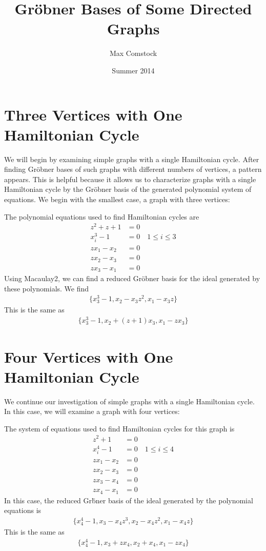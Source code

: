 \documentclass[letterpaper]{article}
\newcommand{\aln}[1]{\begin{align*} #1 \end{align*}} %
\begin{document}
\title{Gr\"obner Bases of Some Directed Graphs}
\author{Max Comstock}
\date{Summer 2014}
\maketitle

\section{Three Vertices with One Hamiltonian Cycle}
We will begin by examining simple graphs with a single Hamiltonian cycle. After finding Gr\"obner bases of such graphs with different numbers of vertices, a pattern appears. This is helpful because it allows us to characterize graphs with a single Hamiltonian cycle by the Gr\"obner basis of the generated polynomial system of equations. We begin with the smallest case, a graph with three vertices:
\begin{center}
\end{center}
The polynomial equations used to find Hamiltonian cycles are
\aln{
  z^2 + z + 1 &= 0\\
  x_i^3 - 1 &= 0 \quad 1 \leq i \leq 3\\
  z x_1 - x_2 &= 0\\
  z x_2 - x_3 &= 0\\
  z x_3 - x_1 &= 0
}
Using Macaulay2, we can find a reduced Gr\"obner basis for the ideal generated by these polynomials. We find
\aln{
  \{x_3^3-1, x_2-x_3z^2, x_1-x_3z\}
}
This is the same as
\aln{
  \{x_3^3-1, x_2+(z+1)x_3, x_1-zx_3\}
}

\newpage

\section{Four Vertices with One Hamiltonian Cycle}
We continue our investigation of simple graphs with a single Hamiltonian cycle. In this case, we will examine a graph with four vertices:
\begin{center}
\end{center}
The system of equations used to find Hamiltonian cycles for this graph is
\aln{
  z^2 + 1 &= 0\\
  x_i^4 - 1 &= 0 \quad 1 \leq i \leq 4\\
  z x_1 - x_2 &= 0\\
  z x_2 - x_3 &= 0\\
  z x_3 - x_4 &= 0\\
  z x_4 - x_1 &= 0
}
In this case, the reduced Gr\"bner basis of the ideal generated by the polynomial equations is
\aln{
  \{x_4^4-1, x_3-x_4z^3, x_2-x_4z^2, x_1-x_4z\}
}
This is the same as
\aln{
  \{x_4^4-1, x_3+zx_4, x_2+x_4, x_1-zx_4\}
}
\end{document}
